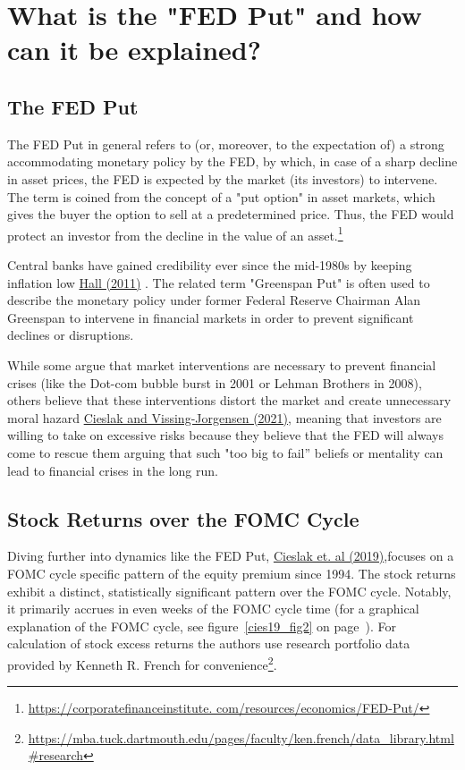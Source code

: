 \chapter{What is the "FED Put" and how can it be explained?}
\section{The FED Put}
The FED Put in general refers to (or, moreover, to the expectation of) a strong accommodating monetary policy by the FED, by which, in case of a sharp decline in asset prices, the FED is expected by the market (its investors) to intervene. The term is coined from the concept of a "put option" in asset markets, which gives the buyer the option to sell at a predetermined price. Thus, the FED would protect an investor from the decline in the value of an asset.\footnote{\url{https://corporatefinanceinstitute. com/resources/economics/FED-Put/}}

Central banks have gained credibility ever since the mid-1980s by keeping inflation low \hyperref[item:hall_is_2011]{Hall (2011)} . The related term "Greenspan Put" is often used to describe the monetary policy under former Federal Reserve Chairman Alan Greenspan to intervene in financial markets in order to prevent significant declines or disruptions. 

While some argue that market interventions are necessary to prevent financial crises (like the Dot-com bubble burst in 2001 or Lehman Brothers in 2008), others believe that these interventions distort the market and create unnecessary moral hazard \hyperref[item:cieslak_economics_2021]{Cieslak and Vissing-Jorgensen (2021)},  meaning that investors are willing to take on excessive risks because they believe that the FED will always come to rescue them arguing that such "too big to fail” beliefs or mentality can lead to financial crises in the long run.

\section{Stock Returns over the FOMC Cycle}

Diving further into dynamics like the FED Put,  \hyperref[item:cieslak_stock_2019]{Cieslak et. al (2019)},focuses on a FOMC cycle specific pattern of the equity premium since 1994. 
The stock returns exhibit a distinct,  statistically significant pattern over the FOMC cycle.  Notably,  it primarily accrues in even weeks of the FOMC cycle time (for a graphical explanation of the FOMC cycle, see figure~\ref{cies19_fig2} on page~\pageref{cies19_fig2}). For calculation of stock excess returns the authors use research portfolio data provided by Kenneth R. French for convenience\footnote{\url{https://mba.tuck.dartmouth.edu/pages/faculty/ken.french/data_library.html\#research}}.


